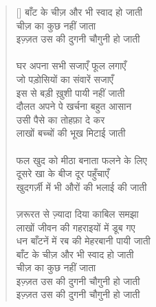 \begin{verse}[\versewidth]\texthindi{
बाँट के चीज़ और भी स्वाद हो जाती\\
चीज़ का कुछ नहीं जाता\\
इज़्ज़त उस की दुगनी चौगुनी हो जाती\\
\\
घर अपना सभी सजाएँ फूल लगाएँ\\
जो पड़ोसियों का संवारें सजाएँ\\
इस से बड़ी ख़ुशी पायी नहीं जाती\\
दौलत अपने पे खर्चना बहुत आसान\\
उसी पैसे का तोहफ़ा दे कर \\
लाखों बच्चों की भूख मिटाई जाती\\
\\
फल खुद को मीठा बनाता फलने के लिए\\
दूसरे खा के बीज दूर पहुँचाएँ\\
खुदगर्ज़ी में भी औरों की भलाई की जाती\\
\\
ज़रूरत से ज़्यादा दिया काबिल समझा\\
लाखों जीवन की गहराइयों में डूब गए\\
धन बाँटनें में रब की मेहरबानी पायी जाती\\
बाँट के चीज़ और भी स्वाद हो जाती\\
चीज़ का कुछ नहीं जाता\\
इज़्ज़त उस की दुगनी चौगुनी हो जाती\\
इज़्ज़त उस की दुगनी चौगुनी हो जाती
}
\end{verse}

